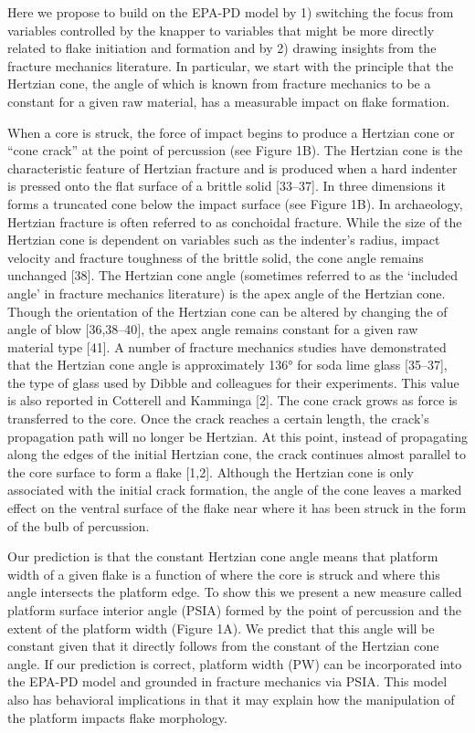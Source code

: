 \documentclass[10pt,letterpaper]{article}
\begin{document}
Here we propose to build on the EPA-PD model by 1) switching the focus
from variables controlled by the knapper to variables that might be more
directly related to flake initiation and formation and by 2) drawing
insights from the fracture mechanics literature. In particular, we start
with the principle that the Hertzian cone, the angle of which is known
from fracture mechanics to be a constant for a given raw material, has a
measurable impact on flake formation.

When a core is struck, the force of impact begins to produce a Hertzian
cone or ``cone crack'' at the point of percussion (see Figure 1B). The
Hertzian cone is the characteristic feature of Hertzian fracture and is
produced when a hard indenter is pressed onto the flat surface of a
brittle solid {[}33--37{]}. In three dimensions it forms a truncated
cone below the impact surface (see Figure 1B). In archaeology, Hertzian
fracture is often referred to as conchoidal fracture. While the size of
the Hertzian cone is dependent on variables such as the indenter's
radius, impact velocity and fracture toughness of the brittle solid, the
cone angle remains unchanged {[}38{]}. The Hertzian cone angle
(sometimes referred to as the `included angle' in fracture mechanics
literature) is the apex angle of the Hertzian cone. Though the
orientation of the Hertzian cone can be altered by changing the of angle
of blow {[}36,38--40{]}, the apex angle remains constant for a given raw
material type {[}41{]}. A number of fracture mechanics studies have
demonstrated that the Hertzian cone angle is approximately 136° for soda
lime glass {[}35--37{]}, the type of glass used by Dibble and colleagues
for their experiments. This value is also reported in Cotterell and
Kamminga {[}2{]}. The cone crack grows as force is transferred to the
core. Once the crack reaches a certain length, the crack's propagation
path will no longer be Hertzian. At this point, instead of propagating
along the edges of the initial Hertzian cone, the crack continues almost
parallel to the core surface to form a flake {[}1,2{]}. Although the
Hertzian cone is only associated with the initial crack formation, the
angle of the cone leaves a marked effect on the ventral surface of the
flake near where it has been struck in the form of the bulb of
percussion.

Our prediction is that the constant Hertzian cone angle means that
platform width of a given flake is a function of where the core is
struck and where this angle intersects the platform edge. To show this
we present a new measure called platform surface interior angle (PSIA)
formed by the point of percussion and the extent of the platform width
(Figure 1A). We predict that this angle will be constant given that it
directly follows from the constant of the Hertzian cone angle. If our
prediction is correct, platform width (PW) can be incorporated into the
EPA-PD model and grounded in fracture mechanics via PSIA. This model
also has behavioral implications in that it may explain how the
manipulation of the platform impacts flake morphology.
\end{document}

